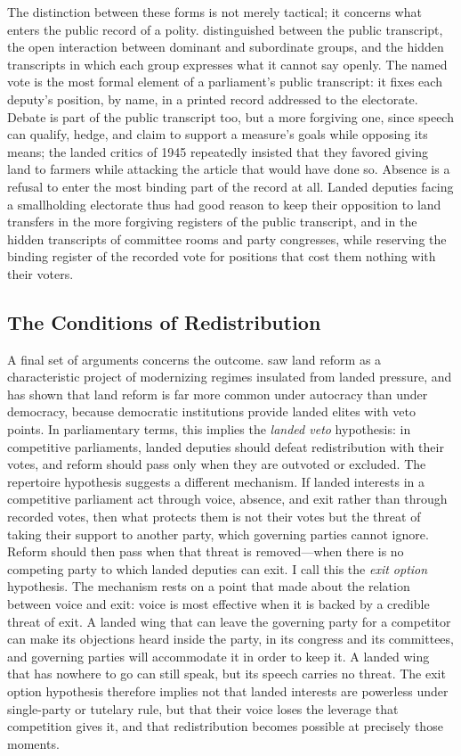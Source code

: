 \documentclass[12pt]{article}
\begin{document}
The distinction between these forms is not merely tactical; it concerns what enters the public record of a polity. \citet{scott1990} distinguished between the public transcript, the open interaction between dominant and subordinate groups, and the hidden transcripts in which each group expresses what it cannot say openly. The named vote is the most formal element of a parliament's public transcript: it fixes each deputy's position, by name, in a printed record addressed to the electorate. Debate is part of the public transcript too, but a more forgiving one, since speech can qualify, hedge, and claim to support a measure's goals while opposing its means; the landed critics of 1945 repeatedly insisted that they favored giving land to farmers while attacking the article that would have done so. Absence is a refusal to enter the most binding part of the record at all. Landed deputies facing a smallholding electorate thus had good reason to keep their opposition to land transfers in the more forgiving registers of the public transcript, and in the hidden transcripts of committee rooms and party congresses, while reserving the binding register of the recorded vote for positions that cost them nothing with their voters.

\subsection*{The Conditions of Redistribution}

A final set of arguments concerns the outcome. \citet{huntington1968} saw land reform as a characteristic project of modernizing regimes insulated from landed pressure, and \citet{albertus2015} has shown that land reform is far more common under autocracy than under democracy, because democratic institutions provide landed elites with veto points. In parliamentary terms, this implies the \textit{landed veto} hypothesis: in competitive parliaments, landed deputies should defeat redistribution with their votes, and reform should pass only when they are outvoted or excluded. The repertoire hypothesis suggests a different mechanism. If landed interests in a competitive parliament act through voice, absence, and exit rather than through recorded votes, then what protects them is not their votes but the threat of taking their support to another party, which governing parties cannot ignore. Reform should then pass when that threat is removed---when there is no competing party to which landed deputies can exit. I call this the \textit{exit option} hypothesis. The mechanism rests on a point that \citet{hirschman1970} made about the relation between voice and exit: voice is most effective when it is backed by a credible threat of exit. A landed wing that can leave the governing party for a competitor can make its objections heard inside the party, in its congress and its committees, and governing parties will accommodate it in order to keep it. A landed wing that has nowhere to go can still speak, but its speech carries no threat. The exit option hypothesis therefore implies not that landed interests are powerless under single-party or tutelary rule, but that their voice loses the leverage that competition gives it, and that redistribution becomes possible at precisely those moments.
\end{document}

